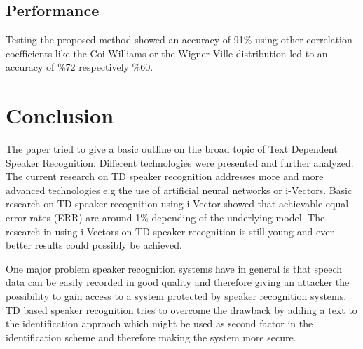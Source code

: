\documentclass[12pt]{article}
\begin{document}
\subsection{Performance}
Testing the proposed method showed an accuracy of 91\% using other  correlation coefficients like the Coi-Williams or the Wigner-Ville distribution led to an accuracy of \%72 respectively \%60. \cite{piezo}
\section{Conclusion}
The paper tried to give a basic outline on the broad topic of Text Dependent Speaker Recognition. Different technologies were presented and further analyzed. The current research on TD speaker recognition addresses more and more advanced technologies  e.g the use of artificial neural networks or i-Vectors. Basic research on TD speaker recognition using i-Vector showed that achievable  equal error rates (ERR) are around 1\% \cite{ivector} depending of the underlying model. The research in using i-Vectors on TD speaker recognition is still young and even better results could possibly be achieved.

One major problem speaker recognition systems have in general is that speech data can be easily recorded in good quality and therefore giving an attacker the possibility to gain access to a system protected by speaker recognition systems. TD based speaker recognition tries to overcome the drawback by adding a text to the identification approach which might be used as second factor in the identification scheme and therefore making the system more secure. 
\newpage


\newpage
\listoffigures
\listoftables
\end{document}
